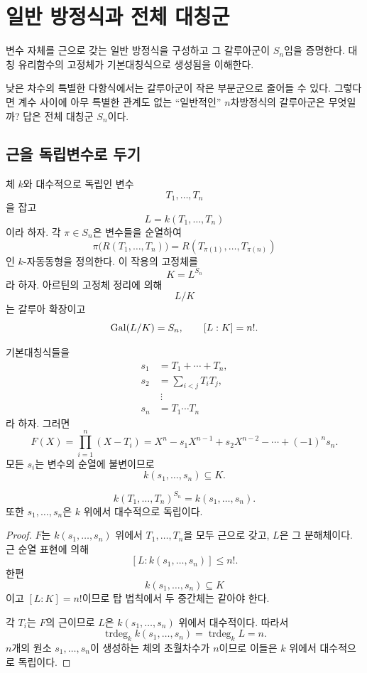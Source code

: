 \clearpage
\section{일반 방정식과 전체 대칭군}
\label{sec:generic-equation}

\begin{learninggoal}
변수 자체를 근으로 갖는 일반 방정식을 구성하고 그 갈루아군이 $S_n$임을 증명한다. 대칭 유리함수의 고정체가 기본대칭식으로 생성됨을 이해한다.
\end{learninggoal}

낮은 차수의 특별한 다항식에서는 갈루아군이 작은 부분군으로 줄어들 수 있다. 그렇다면 계수 사이에 아무 특별한 관계도 없는 ``일반적인'' $n$차방정식의 갈루아군은 무엇일까? 답은 전체 대칭군 $S_n$이다.

\subsection{근을 독립변수로 두기}

체 $k$와 대수적으로 독립인 변수
\[
  T_1,\dots,T_n
\]
을 잡고
\[
  L=k(T_1,\dots,T_n)
\]
이라 하자. 각 $\pi\in S_n$은 변수들을 순열하여
\[
  \pi\bigl(R(T_1,\dots,T_n)\bigr)
  =R(T_{\pi(1)},\dots,T_{\pi(n)})
\]
인 $k$-자동동형을 정의한다. 이 작용의 고정체를
\[
  K=L^{S_n}
\]
라 하자. 아르틴의 고정체 정리에 의해
\[
  L/K
\]
는 갈루아 확장이고
\[
  \operatorname{Gal}(L/K)=S_n,
  \qquad
  [L:K]=n!.
\]

기본대칭식들을
\[
\begin{aligned}
  s_1&=T_1+\cdots+T_n,\\
  s_2&=\sum_{i<j}T_iT_j,\\
  &\ \vdots\\
  s_n&=T_1\cdots T_n
\end{aligned}
\]
라 하자. 그러면
\[
  F(X)=\prod_{i=1}^n(X-T_i)
  =X^n-s_1X^{n-1}+s_2X^{n-2}-\cdots+(-1)^ns_n.
\]
모든 $s_i$는 변수의 순열에 불변이므로
\[
  k(s_1,\dots,s_n)\subseteq K.
\]

\begin{theorem}
\[
  k(T_1,\dots,T_n)^{S_n}
  =k(s_1,\dots,s_n).
\]
또한 $s_1,\dots,s_n$은 $k$ 위에서 대수적으로 독립이다.
\end{theorem}

\begin{proof}
$F$는 $k(s_1,\dots,s_n)$ 위에서 $T_1,\dots,T_n$을 모두 근으로 갖고, $L$은 그 분해체이다. 근 순열 표현에 의해
\[
  [L:k(s_1,\dots,s_n)]\le n!.
\]
한편
\[
  k(s_1,\dots,s_n)\subseteq K
\]
이고 $[L:K]=n!$이므로 탑 법칙에서 두 중간체는 같아야 한다.

각 $T_i$는 $F$의 근이므로 $L$은 $k(s_1,\dots,s_n)$ 위에서 대수적이다. 따라서
\[
  \operatorname{trdeg}_k k(s_1,\dots,s_n)
  =\operatorname{trdeg}_k L
  =n.
\]
$n$개의 원소 $s_1,\dots,s_n$이 생성하는 체의 초월차수가 $n$이므로 이들은 $k$ 위에서 대수적으로 독립이다.
\end{proof}

